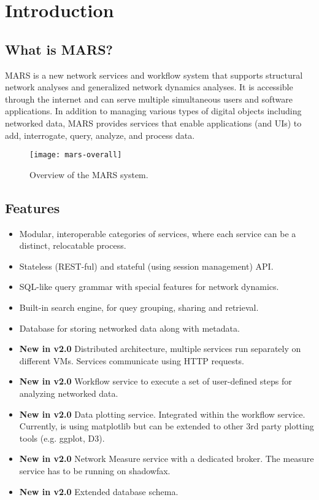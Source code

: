 

\section{Introduction}


\subsection{What is MARS?}
MARS is a new network services and workflow system that supports structural network analyses and generalized network dynamics analyses. It is accessible through the internet and can serve multiple simultaneous users and software applications. In addition to managing various types of digital objects including networked data, MARS
provides services that enable applications (and UIs) to add, interrogate, query, analyze, and process data.

\begin{figure}[H]
\centering
\texttt{[image: mars-overall]}
\caption{
Overview of the MARS system.
}   %
\label{fig:mars-overall}
\end{figure}

\subsection{Features}

\begin{itemize}
\item Modular, interoperable categories
of services, where each service can be a distinct, relocatable process.
\item Stateless (REST-ful) and stateful (using session management) API.
\item SQL-like query grammar with special features for network dynamics.
\item Built-in search engine, for quey grouping, sharing and retrieval.
\item Database for storing networked data along with metadata.
\item \textbf{New in v2.0} Distributed architecture, multiple services run separately  on different VMs. Services communicate using HTTP requests.
\item \textbf{New in v2.0} Workflow service to execute a set of user-defined steps for analyzing networked data.
\item \textbf{New in v2.0} Data plotting service. Integrated within the workflow service. Currently, is using matplotlib but can be extended to other 3rd party plotting tools (e.g. ggplot, D3).
\item \textbf{New in v2.0} Network Measure service with a dedicated broker. The measure service has to be running on shadowfax.
\item \textbf{New in v2.0} Extended database schema.



\end{itemize}



